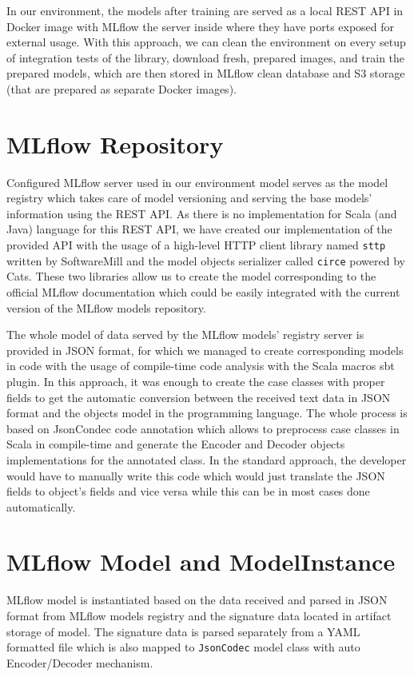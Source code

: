 In our environment, the models after training are served as a local REST API in Docker image with MLflow
the server inside where they have ports exposed for external usage. With this approach, we can clean the environment on every setup of integration tests of the library, download fresh, prepared images, and
train the prepared models, which are then stored in MLflow clean database and S3 storage (that are
prepared as separate Docker images).

\section{MLflow Repository}

Configured MLflow server used in our environment model serves as the model registry which takes care
of model versioning and serving the base models' information using the REST API. As there is no
implementation for Scala (and Java) language for this REST API, we have created our implementation
of the provided API with the usage of a high-level HTTP client library named \texttt{sttp} written by SoftwareMill
and the model objects serializer called \texttt{circe} powered by Cats. These two libraries allow us to create
the model corresponding to the official MLflow documentation which could be easily integrated with the
current version of the MLflow models repository.

The whole model of data served by the MLflow models' registry server is provided in JSON format, for which
we managed to create corresponding models in code with the usage of compile-time code analysis with
the Scala macros sbt plugin. In this approach, it was enough to create the case classes with proper
fields to get the automatic conversion between the received text data in JSON format and the objects
model in the programming language. The whole process is based on JsonCondec code annotation which allows
to preprocess case classes in Scala in compile-time and generate the Encoder and Decoder objects
implementations for the annotated class. In the standard approach, the developer would have to manually
write this code which would just translate the JSON fields to object’s fields and vice versa while
this can be in most cases done automatically.

\section{MLflow Model and ModelInstance}

MLflow model is instantiated based on the data received and parsed in JSON format from MLflow models
registry and the signature data located in artifact storage of model. The signature data is parsed
separately from a YAML formatted file which is also mapped to \texttt{JsonCodec} model class with auto Encoder/Decoder
mechanism.

